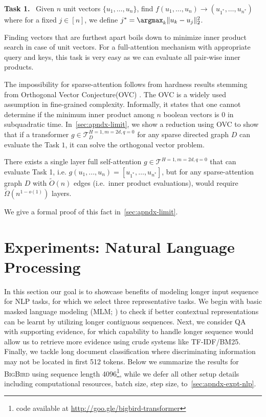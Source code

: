\textbf{Task 1.} \ Given $n$ unit vectors $\{u_1,\dots,u_n\}$, find $f(u_1,\dots,u_n) \to (u_{1^*}, \dots, u_{n^*})$  where for a fixed $j \in [n]$, we define $ j^* = \argmax_{k} \|u_k - u_j\|_2^2$.

Finding vectors that are furthest apart boils down to minimize inner product search in case of unit vectors. For a full-attention mechanism with appropriate query and keys, this task is very easy as we can evaluate all pair-wise inner products. 

The impossibility for sparse-attention follows from hardness results stemming from Orthogonal Vector Conjecture(OVC) \citep{abboud2014consequences,abboud2015tight,backurs2015edit,williams2005new}. The OVC  is a widely used assumption in fine-grained complexity. Informally, it states that one cannot determine if the minimum inner product among $n$ boolean vectors is $0$ in subquadratic time. In~\ref{sec:apndx-limit}, we show a reduction using  OVC to show that if a transformer $g \in \mathcal{T}_D^{H=1,m=2d,q=0}$ for any sparse directed graph $D$ can evaluate the Task $1$, it can solve the orthogonal vector problem.

\begin{proposition}
    There exists a single layer full self-attention $g\in\mathcal{T}^{H=1,m=2d,q=0}$ that can evaluate Task 1,  i.e. $g(u_1,...,u_n) = [u_{1^*},\dots, u_{n^*}]$, but for any sparse-attention graph $D$ with $\tilde{O}(n)$ edges (i.e.~inner product evaluations), would require $\tilde{\Omega}(n^{1-o(1)})$ layers.
\end{proposition}

We give a formal proof of this fact in~\ref{sec:apndx-limit}.

\section{Experiments: Natural Language Processing} \label{sec:expt-nlp}

In this section our goal is to showcase benefits of modeling longer input sequence for NLP tasks, for which we select three representative tasks. We begin with basic masked language modeling (MLM; \citealt{devlin2018bert}) to check if better contextual representations can be learnt by utilizing longer contiguous sequences. Next, we consider QA with supporting evidence, for which capability to handle longer sequence would allow us to retrieve more evidence using crude systems like TF-IDF/BM25. Finally, we tackle long document classification where discriminating information may not be located in first 512 tokens. Below we summarize the results for \textsc{BigBird} using sequence length 4096\footnote{code available at \url{http://goo.gle/bigbird-transformer}}, while we defer all other setup details including computational resources, batch size, step size, to~\ref{sec:apndx-expt-nlp}. 

